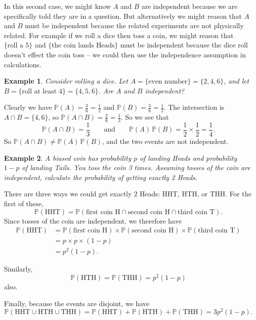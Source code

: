 \documentclass[
  a4paper,
]{book}
\theoremstyle{definition}
\theoremstyle{definition}
\newtheorem{example}{Example}[chapter]
\theoremstyle{definition}
\theoremstyle{definition}
\theoremstyle{remark}
\begin{document}
In this second case, we might know \(A\) and \(B\) are independent because we are specifically told they are in a question. But alternatively we might reason that \(A\) and \(B\) must be independent because the related experiments are not physically related. For example if we roll a dice then toss a coin, we might reason that \(\{\text{roll a 5}\}\) and \(\{\text{the coin lands Heads}\}\) must be independent because the dice roll doesn't effect the coin toss -- we could then use the independence assumption in calculations.

\begin{example}
\emph{Consider rolling a dice. Let \(A = \{\text{even number}\} = \{2,4,6\}\), and let \(B = \{\text{roll at least 4}\} = \{4,5,6\}\). Are \(A\) and \(B\) independent?}

Clearly we have \(\mathbb P(A) = \frac36 = \frac12\) and \(\mathbb P(B) = \frac 36 = \frac12\). The intersection is \(A \cap B = \{4,6\}\), so \(\mathbb P(A \cap B) = \frac26 = \frac13\). So we see that
\[ \mathbb P(A\cap B) = \frac13  \qquad \text{and} \qquad  \mathbb P(A)\, \mathbb P(B) = \frac12 \times \frac12 = \frac14 . \]
So \(\mathbb P(A \cap B) \neq \mathbb P(A)\, \mathbb P(B)\), and the two events are not independent.
\end{example}

\begin{example}
\emph{A biased coin has probability \(p\) of landing Heads and probability \(1-p\) of landing Tails. You toss the coin 3 times. Assuming tosses of the coin are independent, calculate the probability of getting exactly 2 Heads.}

There are three ways we could get exactly 2 Heads: HHT, HTH, or THH. For the first of these,
\[ \mathbb P(\text{HHT}) = \mathbb P(\text{first coin H} \cap \text{second coin H} \cap \text{third coin T}) . \]
Since tosses of the coin are independent, we therefore have
\begin{align*}
\mathbb P(\text{HHT})
  &= \mathbb P(\text{first coin H}) \times \mathbb P ( \text{second coin H} )\times \mathbb P(\text{third coin T}) \\
  &=p \times p \times (1-p) \\
  &= p^2(1-p).
\end{align*}

Similarly,
\[ \mathbb P(\text{HTH}) = \mathbb P(\text{THH}) = p^2(1-p) \]
also.

Finally, because the events are disjoint, we have
\[ \mathbb P(\text{HHT} \cup\text{HTH} \cup \text{THH}) = \mathbb P(\text{HHT} ) + \mathbb P(\text{HTH}) + \mathbb P(\text{THH}) = 3p^2(1-p) . \]
\end{example}
\end{document}
